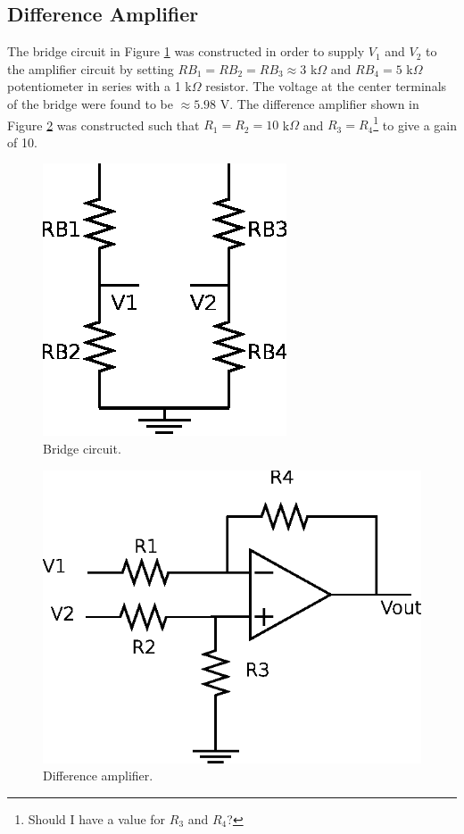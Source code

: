 \documentclass[11pt,onecolumn]{article}
\begin{document}
\subsection{Difference Amplifier}
The bridge circuit in Figure \ref{fig:Diagram1} was constructed in order to supply $V_1$ and $V_2$ to the amplifier circuit by setting $RB_1 = RB_2 = RB_3 \approx 3$ k$\Omega$ and $RB_4 = 5$ k$\Omega$ potentiometer in series with a 1 k$\Omega$ resistor. The voltage at the center terminals of the bridge were found to be $\approx 5.98$ V. The difference amplifier shown in Figure \ref{fig:Diagram2} was constructed such that $R_1 = R_2 = 10$ k$\Omega$ and $R_3 = R_4$\footnote{Should I have a value for $R_3$ and $R_4$?} to give a gain of 10.
%
%
\begin{figure}
\center
\includegraphics{Diagram1.eps}
\caption{Bridge circuit.}\label{fig:Diagram1}
\end{figure}
%
%
\begin{figure}
\center
\includegraphics{Diagram2.eps}
\caption{Difference amplifier.}\label{fig:Diagram2}
\end{figure}
\end{document}
